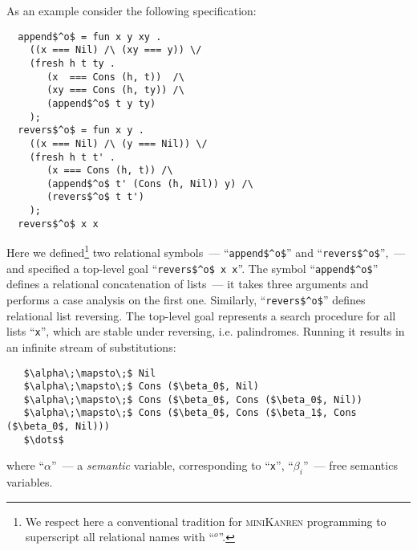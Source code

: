 As an example consider the following specification:

\begin{lstlisting}
  append$^o$ = fun x y xy .
    ((x === Nil) /\ (xy === y)) \/
    (fresh h t ty .
       (x  === Cons (h, t))  /\
       (xy === Cons (h, ty)) /\
       (append$^o$ t y ty)
    );
  revers$^o$ = fun x y .
    ((x === Nil) /\ (y === Nil)) \/
    (fresh h t t' .
       (x === Cons (h, t)) /\
       (append$^o$ t' (Cons (h, Nil)) y) /\
       (revers$^o$ t t') 
    );
  revers$^o$ x x
\end{lstlisting}

Here we defined\footnote{We respect here a conventional tradition for \textsc{miniKanren} programming to superscript all relational names with ``$^o$''.}
two relational symbols~--- ``\lstinline|append$^o$|'' and ``\lstinline|revers$^o$|'',~--- and specified a top-level goal ``\lstinline|revers$^o$ x x|''.
The symbol ``\lstinline|append$^o$|'' defines a relational concatenation of lists~--- it takes three arguments and performs a case analysis on the first one.  Similarly,
``\lstinline|revers$^o$|'' defines relational list reversing. The top-level goal represents a search procedure for all lists ``\lstinline|x|'', which are stable under reversing, i.e.
palindromes. Running it results in an infinite stream of substitutions:

\begin{lstlisting}
   $\alpha\;\mapsto\;$ Nil
   $\alpha\;\mapsto\;$ Cons ($\beta_0$, Nil)
   $\alpha\;\mapsto\;$ Cons ($\beta_0$, Cons ($\beta_0$, Nil))
   $\alpha\;\mapsto\;$ Cons ($\beta_0$, Cons ($\beta_1$, Cons ($\beta_0$, Nil)))
   $\dots$
\end{lstlisting}

where ``$\alpha$''~--- a \emph{semantic} variable, corresponding to ``\lstinline|x|'', ``$\beta_i$''~--- free semantics variables.

